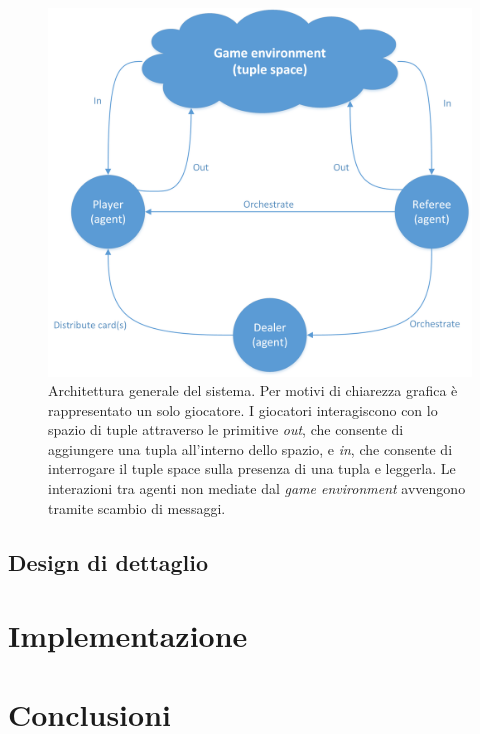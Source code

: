 \documentclass[a4paper,12pt]{article}
\begin{document}
\begin{figure}[H]
	\centering
	\includegraphics[width=\textwidth]{./img/general_architecture.png}
	\caption{Architettura generale del sistema. Per motivi di chiarezza grafica è rappresentato un solo giocatore. I giocatori interagiscono  con lo spazio di tuple attraverso le primitive \emph{out}, che consente di aggiungere una tupla all'interno dello spazio, e \emph{in}, che consente di interrogare il tuple space sulla presenza di una tupla e leggerla. Le interazioni tra agenti non mediate dal \emph{game environment} avvengono tramite scambio di messaggi.\label{general-architecture}}
\end{figure}


\subsection{Design di dettaglio} \label{design}

\section{Implementazione} \label{implementation}

\section{Conclusioni} \label{conclusions}

\fancyhead{}
\renewcommand{\headrulewidth}{0pt}
\appendix
{}
\end{document}
